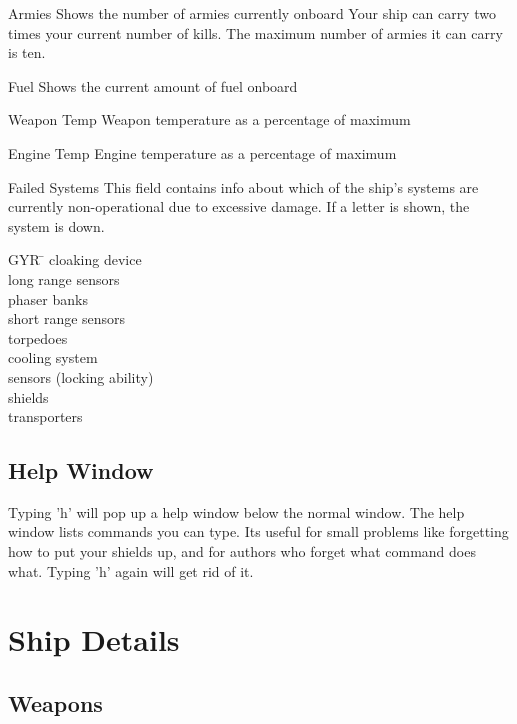 \begin{list}{}{
	\renewcommand{\makelabel}[1]{{\tt #1 \hfill}}
         \setlength{\leftmargin}{2.75cm}
         \setlength{\labelwidth}{\leftmargin}
         \setlength{\labelsep}{0in}
}
\item[Armies] Shows the number of armies currently onboard
Your ship can carry two times your current number of kills.
The maximum number of armies it can carry is ten.

\item[Fuel] Shows the current amount of fuel onboard

\item[Weapon Temp] Weapon temperature as a percentage of maximum

\item[Engine Temp] Engine temperature as a percentage of maximum

\item[Failed Systems]
	This field contains info about which of the ship's systems are currently
	non-operational due to excessive damage.  If a letter is shown, 
        the system is down.

	\begin{tabbing}
        GYR \= \kill
	 \> cloaking device \\
	 \> long range sensors \\
	 \> phaser banks \\
	 \> short range sensors  \\
	 \> torpedoes \\
	 \> cooling system \\
	 \> sensors (locking ability) \\
	 \> shields \\
	 \> transporters \\
	\end{tabbing}
\end{list}


\subsection{Help Window}

Typing 'h' will pop up a help window below the normal window.  The help
window lists commands you can type.  Its useful for small problems
like forgetting how to put your shields up, and for authors who forget
what command does what.  Typing 'h' again will get rid of it.

\section{Ship Details}

\subsection{Weapons}

